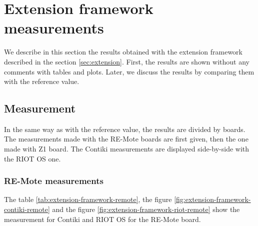 \section{Extension framework measurements}

We describe in this section the results obtained with the extension framework described in the section \ref{sec:extension}.
First, the results are shown without any comments with tables and plots.
Later, we discuss the results by comparing them with the reference value.

\subsection{Measurement}

In the same way as with the reference value, the results are divided by boards.
The measurements made with the RE-Mote boards are first given, then the one made with Z1 board.
The Contiki measurements are displayed side-by-side with the RIOT OS one.

\subsubsection{RE-Mote measurements}
The table \ref{tab:extension-framework-remote}, the figure \ref{fig:extension-framework-contiki-remote} and the figure \ref{fig:extension-framework-riot-remote} show the measurement for Contiki and RIOT OS for the RE-Mote board.



